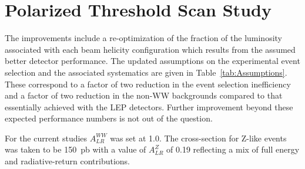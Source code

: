 \documentclass[12pt]{article}
\begin{document}
\section*{Polarized Threshold Scan Study}

The improvements include a re-optimization of the fraction of the luminosity 
associated with each beam helicity configuration which results from 
the assumed better detector performance.
The updated assumptions on the experimental event selection and the associated systematics are 
given in Table~\ref{tab:Assumptions}. These correspond to a factor of two reduction in the 
event selection inefficiency and a factor of two reduction in the non-WW backgrounds compared to 
that essentially achieved with the LEP detectors. Further improvement beyond these expected 
performance numbers is not out of the question.

For the current studies $A_{LR}^{WW}$ was set at 1.0. The cross-section 
for Z-like events was taken to be 150~pb with 
a value of $A_{LR}^Z$ of 0.19 reflecting a mix of full energy 
and radiative-return contributions.
\end{document}

